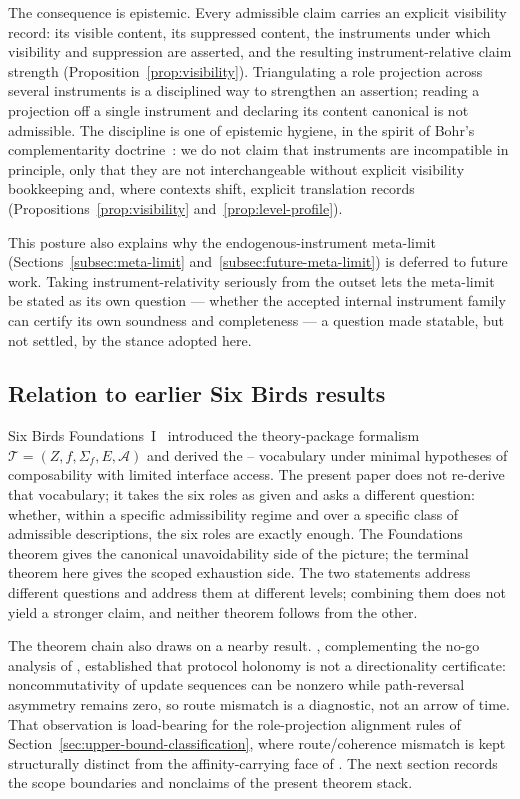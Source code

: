 The consequence is epistemic. Every admissible claim carries an
explicit visibility record: its visible content, its suppressed
content, the instruments under which visibility and suppression are
asserted, and the resulting instrument-relative claim strength
(Proposition~\ref{prop:visibility}). Triangulating a role projection
across several instruments is a disciplined way to strengthen an
assertion; reading a projection off a single instrument and declaring
its content canonical is not admissible. The discipline is one of
epistemic hygiene, in the spirit of Bohr's complementarity
doctrine~\citep{Bohr1958}: we do not claim that instruments are
incompatible in principle, only that they are not interchangeable
without explicit visibility bookkeeping and, where contexts shift,
explicit translation records
(Propositions~\ref{prop:visibility} and~\ref{prop:level-profile}).

This posture also explains why the endogenous-instrument meta-limit
(Sections~\ref{subsec:meta-limit} and~\ref{subsec:future-meta-limit})
is deferred to future work. Taking instrument-relativity seriously
from the outset lets the meta-limit be stated as its own question ---
whether the accepted internal instrument family can certify its own
soundness and completeness --- a question made statable, but not
settled, by the stance adopted here.

\subsection{Relation to earlier Six Birds results}\label{subsec:discussion-earlier-results}

Six Birds Foundations~I~\citep{Tsiokos2026SixBirdsFoundations}
introduced the theory-package formalism
\(\mathcal{T} = (Z, f, \Sigma_f, E, \mathcal{A})\) and derived the
\Pone{}--\Psix{} vocabulary under minimal hypotheses of composability
with limited interface access. The present paper does not re-derive
that vocabulary; it takes the six roles as given and asks a
different question: whether, within a specific admissibility regime
and over a specific class of admissible descriptions, the six roles
are exactly enough. The Foundations theorem gives the canonical
unavoidability side of the picture; the terminal theorem here gives
the scoped exhaustion side. The two statements address different
questions and address them at different levels; combining them does
not yield a stronger claim, and neither theorem follows from the
other.

The theorem chain also draws on a nearby
result. \citet{Tsiokos2026SixBirdsProtocolTrap}, complementing the
no-go analysis of \citet{Tsiokos2026SixBirdsNoGo}, established that
protocol holonomy is not a directionality certificate:
noncommutativity of update sequences can be nonzero while
path-reversal asymmetry remains zero, so route mismatch is a
diagnostic, not an arrow of time. That observation is load-bearing
for the role-projection alignment rules of
Section~\ref{sec:upper-bound-classification}, where \Pthree{}
route/coherence mismatch is kept structurally distinct from the
affinity-carrying face of \Psix{}. The next section records the
scope boundaries and nonclaims of the present theorem stack.
